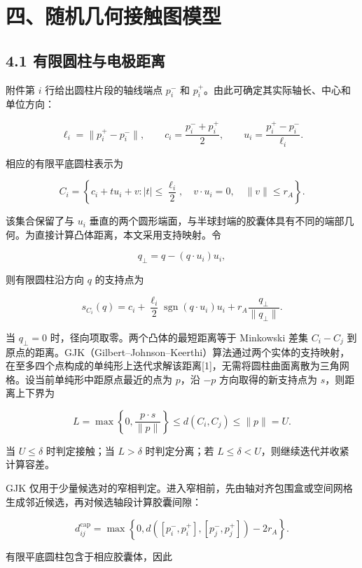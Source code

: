 \section{四、随机几何接触图模型}\label{ux56dbux968fux673aux51e0ux4f55ux63a5ux89e6ux56feux6a21ux578b}

\subsection{4.1 有限圆柱与电极距离}\label{ux6709ux9650ux5706ux67f1ux4e0eux7535ux6781ux8dddux79bb}

附件第 \(i\) 行给出圆柱片段的轴线端点 \(p_i^-\) 和 \(p_i^+\)。由此可确定其实际轴长、中心和单位方向：

\[
\ell_i=\lVert p_i^+-p_i^-\rVert,
\qquad
c_i=\frac{p_i^-+p_i^+}{2},
\qquad
u_i=\frac{p_i^+-p_i^-}{\ell_i}.
\]

相应的有限平底圆柱表示为

\[
C_i=\left\{c_i+t u_i+v:
|t|\leq\frac{\ell_i}{2},\quad
v\cdot u_i=0,\quad
\lVert v\rVert\leq r_A\right\}.
\]

该集合保留了与 \(u_i\) 垂直的两个圆形端面，与半球封端的胶囊体具有不同的端部几何。为直接计算凸体距离，本文采用支持映射。令

\[
q_{\perp}=q-(q\cdot u_i)u_i,
\]

则有限圆柱沿方向 \(q\) 的支持点为

\[
s_{C_i}(q)=c_i
+\frac{\ell_i}{2}\operatorname{sgn}(q\cdot u_i)u_i
+r_A\frac{q_{\perp}}{\lVert q_{\perp}\rVert}.
\]

当 \(q_{\perp}=0\) 时，径向项取零。两个凸体的最短距离等于 Minkowski 差集 \(C_i-C_j\) 到原点的距离。GJK（Gilbert--Johnson--Keerthi）算法通过两个实体的支持映射，在至多四个点构成的单纯形上迭代求解该距离{[}1{]}，无需将圆柱曲面离散为三角网格。设当前单纯形中距原点最近的点为 \(p\)，沿 \(-p\) 方向取得的新支持点为 \(s\)，则距离上下界为

\[
L=\max\left\{0,\frac{p\cdot s}{\lVert p\rVert}\right\}
\leq d(C_i,C_j)\leq
\lVert p\rVert=U.
\]

当 \(U\leq\delta\) 时判定接触；当 \(L>\delta\) 时判定分离；若 \(L\leq\delta<U\)，则继续迭代并收紧计算容差。

GJK 仅用于少量候选对的窄相判定。进入窄相前，先由轴对齐包围盒或空间网格生成邻近候选，再对候选轴段计算胶囊间隙：

\[
d_{ij}^{\mathrm{cap}}
=\max\left\{0,
d\!\left([p_i^-,p_i^+],[p_j^-,p_j^+]\right)-2r_A
\right\}.
\]

有限平底圆柱包含于相应胶囊体，因此

